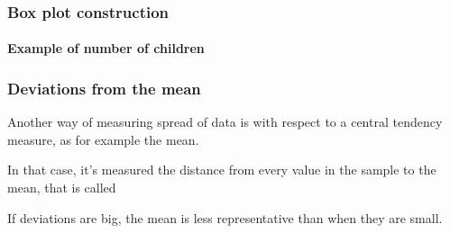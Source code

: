 \begin{frame}
\frametitle{Box plot construction}
\framesubtitle{Example of number of children}
\begin{enumerate}
 
 
\end{enumerate}
\begin{center}
\scalebox{0.45}{}
\end{center}
\end{frame}


\begin{frame}
\frametitle{Deviations from the mean}
Another way of measuring spread of data is with respect to a central tendency measure, as for example the mean. 

In that case, it's measured the distance from every value in the sample to the mean, that is called

\begin{center}
\scalebox{1}{}
\end{center}

If deviations are big, the mean is less representative than when they are small.
\end{frame}


